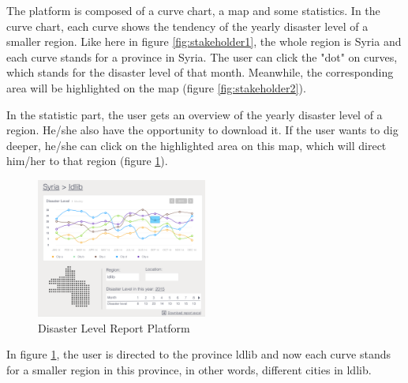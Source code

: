       The platform is composed of a curve chart,
      a map and some statistics.
      In the curve chart,
      each curve shows the tendency of the yearly disaster level of a smaller region.
      Like here in figure \ref{fig:stakeholder1}, 
      the whole region is Syria and each curve stands for a province in Syria.
      The user can click the "dot" on curves,
      which stands for the disaster level of that month.
      Meanwhile, the corresponding area will be highlighted on the map (figure \ref{fig:stakeholder2}).

      In the statistic part,
      the user gets an overview of the yearly disaster level of a region.
      He/she also have the opportunity to download it.
      If the user wants to dig deeper, 
      he/she can click on the highlighted area on this map,
      which will direct him/her to that region (figure \ref{fig:stakeholder3}).

      \begin{figure}[H]
      \centering
      \includegraphics[width=0.5\textwidth]{figures/function-stakeholder-3}
      \caption{Disaster Level Report Platform}
      \label{fig:stakeholder3}
      \end{figure}

      In figure \ref{fig:stakeholder3},
      the user is directed to the province ldlib and now each curve stands for a smaller region in this province,
      in other words, different cities in ldlib.
    